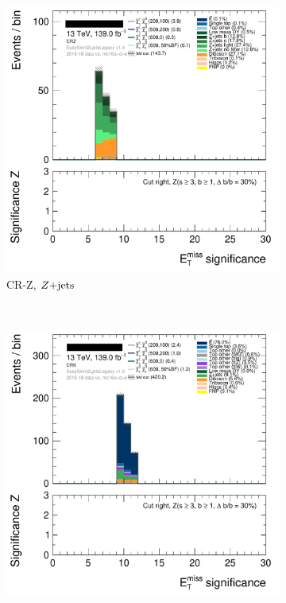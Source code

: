 \begin{figure}[tp]
\begin{subfigure}{0.48\textwidth}
\includegraphics[width=\textwidth]{figures/2ljets_splits_met_Sign_CRZ.png}
\caption{CR-Z, $Z\mathrm{+jets}$}
\end{subfigure}
\\[0.5em]
\begin{subfigure}{0.48\textwidth}
\centering
\includegraphics[width=\textwidth]{figures/2ljets_splits_met_Sign_CRtt.png}

\end{subfigure}
\end{figure}
